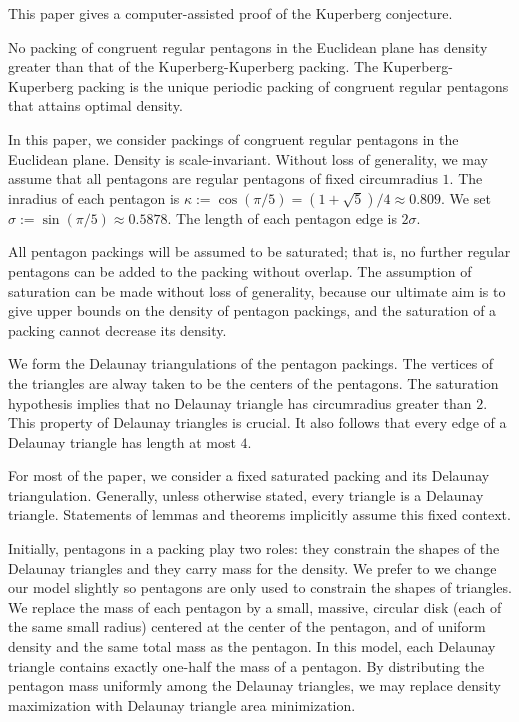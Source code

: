 
This paper gives a computer-assisted proof of the Kuperberg conjecture.


\begin{theorem}  No packing of congruent regular pentagons in the Euclidean
plane has density greater than that of
the Kuperberg-Kuperberg packing.   The Kuperberg-Kuperberg packing is the
unique periodic packing of congruent regular pentagons that attains optimal density.
\end{theorem}



In this paper, we consider packings of congruent regular pentagons in
the Euclidean plane.   Density is scale-invariant.  Without loss of generality,
we may assume that all pentagons are regular pentagons of fixed
circumradius $1$.  The inradius of each pentagon is $\kappa:= \cos
(\pi/5) = (1+\sqrt{5})/4 \approx 0.809$. We set $\sigma := \sin(\pi/5)
\approx 0.5878$.  The length of each pentagon edge is $2\sigma$.

All pentagon packings will be assumed to be saturated; that is, no
further regular pentagons can be added to the packing without overlap.
The assumption of saturation can be made without loss of generality,
because our ultimate aim is to give upper bounds on the density of
pentagon packings, and the saturation of a packing cannot decrease its
density.

We form the Delaunay triangulations of the pentagon packings.  The
vertices of the triangles are alway taken to be the centers of the
pentagons.  The saturation hypothesis implies that no Delaunay
triangle has circumradius greater than $2$.  This property of Delaunay
triangles is crucial.  It also follows that every edge of a Delaunay
triangle has length at most $4$.

For most of the paper, we consider a fixed saturated packing and its
Delaunay triangulation.  Generally, unless otherwise stated,
every triangle is a  Delaunay triangle.
Statements of lemmas and theorems implicitly
assume this fixed context.

Initially, pentagons in a packing play two roles: they constrain the
shapes of the Delaunay triangles and they carry mass for the density.
We prefer to we change our model slightly so pentagons are only used
to constrain the shapes of triangles.  We replace the mass of each
pentagon by a small, massive, circular disk (each of the same small
radius) centered at the center of the pentagon, and of uniform density
and the same total mass as the pentagon.  In this model, each Delaunay
triangle contains exactly one-half the mass of a pentagon.  By
distributing the pentagon mass uniformly among the Delaunay triangles,
we may replace density maximization with Delaunay triangle area
minimization.

